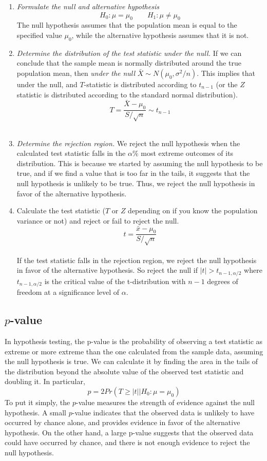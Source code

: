 \documentclass{./../../Latex/handout}
\begin{document}
\begin{enumerate}
\item \textit{Formulate the null and alternative hypothesis} 
$$ H_0: \mu=\mu_0 \quad \quad  H_1: \mu\neq \mu_0 $$
The null hypothesis assumes that the population mean is equal to the specified value $\mu_0$, while the alternative hypothesis assumes that it is not. \\

\item \textit{Determine the distribution of the test statistic under the null.}
If we can conclude that the sample mean is normally distributed around the true population mean, then \textit{under the null} $ \bar{X} \sim N(\mu_0, \sigma^2/n) $. This implies that under the null, and $T$-statistic is distributed according to $t_{n-1}$ (or the $Z$ statistic is distributed according to the standard normal distribution).
$$ T = \frac{\bar{X}-\mu_0}{S/\sqrt{n}} \sim t_{n-1} $$ \\
\item \textit{Determine the rejection region.} We reject the null hypothesis when the calculated test statistic falls in the $\alpha \%$ most extreme outcomes of its distribution. This is because we started by assuming the null hypothesis to be true, and if we find a value that is too far in the tails, it suggests that the null hypothesis is unlikely to be true. Thus, we reject the null hypothesis in favor of the alternative hypothesis. \\
\item Calculate the test statistic ($T$ or $Z$ depending on if you know the population variance or not) and reject or fail to reject the null. 
$$ t = \frac{\bar{x}-\mu_0}{S/\sqrt{n}} $$ \\
If the test statistic falls in the rejection region, we reject the null hypothesis in favor of the alternative hypothesis. So reject the null if $|t|>t_{n-1, \alpha/2}$ where $t_{n-1,\alpha/2}$ is the critical value of the t-distribution with $n-1$ degrees of freedom at a significance level of $\alpha$.
\end{enumerate}

\subsection*{$p$-value}

In hypothesis testing, the p-value is the probability of observing a test statistic as extreme or more extreme than the one calculated from the sample data, assuming the null hypothesis is true. We can calculate it by finding the area in the tails of the distribution beyond the absolute value of the observed test statistic and doubling it. In particular,
$$p = 2 Pr(T \geq |t| |H_0: \mu=\mu_0) $$
To put it simply, the $p$-value measures the strength of evidence against the null hypothesis. A small $p$-value indicates that the observed data is unlikely to have occurred by chance alone, and provides evidence in favor of the alternative hypothesis. On the other hand, a large p-value suggests that the observed data could have occurred by chance, and there is not enough evidence to reject the null hypothesis.
\end{document}
